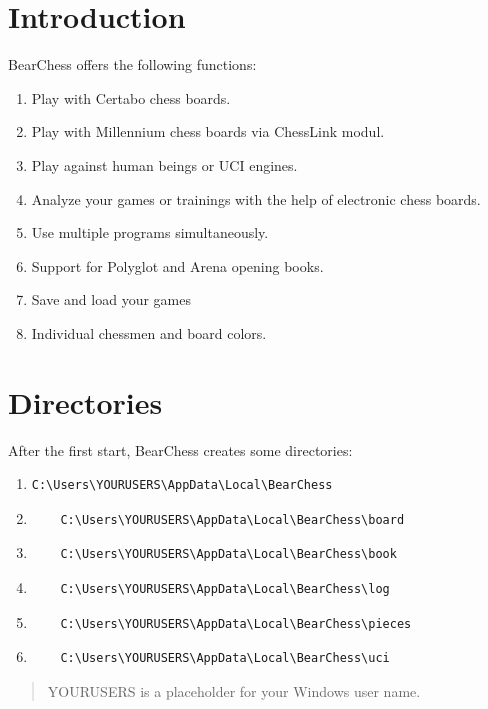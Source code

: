 \documentclass[11pt,a4paper]{article}
\begin{document}
\section{Introduction}
BearChess offers the following functions:
\begin{enumerate}
	  \item Play with Certabo chess boards.
	  \item Play with Millennium chess boards via ChessLink modul.
  	  \item Play against human beings or UCI engines.
  	  \item Analyze your games or trainings with the help of electronic chess boards.
  	  \item Use multiple programs simultaneously.
  	  \item Support for Polyglot and Arena opening books.
  	  \item Save and load your games
  	  \item Individual chessmen and board colors.
\end{enumerate}

\section{Directories}
After the first start, BearChess creates some directories:
\begin{enumerate}
	\item \begin{verbatim}
C:\Users\YOURUSERS\AppData\Local\BearChess
	\end{verbatim} 
	\item\begin{verbatim}
	C:\Users\YOURUSERS\AppData\Local\BearChess\board
	\end{verbatim} 
	\item \begin{verbatim}
	C:\Users\YOURUSERS\AppData\Local\BearChess\book
	\end{verbatim} 	
		\item \begin{verbatim}
	C:\Users\YOURUSERS\AppData\Local\BearChess\log
	\end{verbatim} 	
		\item \begin{verbatim}
	C:\Users\YOURUSERS\AppData\Local\BearChess\pieces
	\end{verbatim} 	
		\item \begin{verbatim}
	C:\Users\YOURUSERS\AppData\Local\BearChess\uci
	\end{verbatim} 	

\end{enumerate}
\begin{quote}
YOURUSERS is a placeholder for your Windows user name.
\end{quote}
\end{document}

